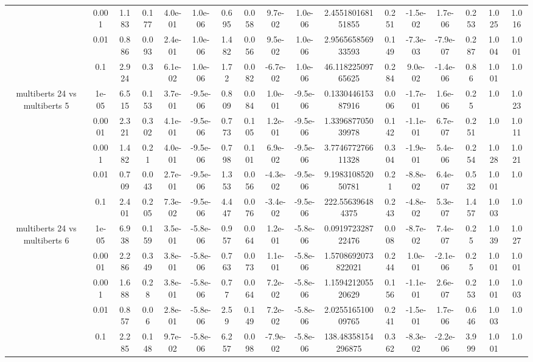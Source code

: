 \begin{tabular}{|c|c|c|c|c|c|c|c|c|c|c|c|c|c|c|c|c|}
 & 0.001 & 1.183 & 0.177 & 4.0e-01 & 1.0e-06 & 0.695 & 0.058 & 9.7e-02 & 1.0e-06 & 2.455180168151855 & 0.251 & -1.5e-02 & 1.7e-06 & 0.253 & 1.025 & 1.016 \\
 & 0.01 & 0.886 & 0.093 & 2.4e-01 & 1.0e-06 & 1.482 & 0.056 & 9.5e-02 & 1.0e-06 & 2.956565856933593 & 0.149 & -7.3e-03 & -7.9e-07 & 0.287 & 1.004 & 1.001 \\
 & 0.1 & 2.924 & 0.3 & 6.1e-02 & 1.0e-06 & 1.72 & 0.082 & -6.7e-02 & 1.0e-06 & 46.11822509765625 & 0.284 & 9.0e-02 & -1.4e-06 & 0.86 & 1.001 & 1.0 \\
\hline
\multirow{5}{*}{multiberts 24 vs multiberts 5} & 1e-05 & 6.515 & 0.153 & 3.7e-01 & -9.5e-06 & 0.809 & 0.084 & 1.0e-01 & -9.5e-06 & 0.133044615387916 & 0.006 & -1.7e-01 & 1.6e-06 & 0.25 & 1.0 & 1.023 \\
 & 0.0001 & 2.321 & 0.302 & 4.1e-01 & -9.5e-06 & 0.773 & 0.105 & 1.2e-01 & -9.5e-06 & 1.339687705039978 & 0.142 & -1.1e-01 & 6.7e-07 & 0.251 & 1.0 & 1.011 \\
 & 0.001 & 1.482 & 0.21 & 4.0e-01 & -9.5e-06 & 0.798 & 0.101 & 6.9e-02 & -9.5e-06 & 3.774677276611328 & 0.304 & -1.9e-01 & 5.4e-06 & 0.254 & 1.028 & 1.021 \\
 & 0.01 & 0.709 & 0.043 & 2.7e-01 & -9.5e-06 & 1.353 & 0.056 & -4.3e-02 & -9.5e-06 & 9.198310852050781 & 0.21 & -8.8e-02 & 6.4e-07 & 0.532 & 1.001 & 1.0 \\
 & 0.1 & 2.401 & 0.205 & 7.3e-02 & -9.5e-06 & 4.447 & 0.076 & -3.4e-02 & -9.5e-06 & 222.556396484375 & 0.243 & -4.8e-02 & 5.3e-07 & 1.457 & 1.003 & 1.0 \\
\hline
\multirow{5}{*}{multiberts 24 vs multiberts 6} & 1e-05 & 6.938 & 0.159 & 3.5e-01 & -5.8e-06 & 0.957 & 0.064 & 1.2e-01 & -5.8e-06 & 0.091972328722476 & 0.008 & -8.7e-02 & 7.4e-07 & 0.25 & 1.039 & 1.027 \\
 & 0.0001 & 2.286 & 0.349 & 3.8e-01 & -5.8e-06 & 0.763 & 0.073 & 1.1e-01 & -5.8e-06 & 1.5708692073822021 & 0.244 & 1.0e-01 & -2.1e-06 & 0.25 & 1.001 & 1.001 \\
 & 0.001 & 1.688 & 0.28 & 3.8e-01 & -5.8e-06 & 0.77 & 0.064 & 7.2e-02 & -5.8e-06 & 1.159421205520629 & 0.156 & -1.1e-01 & 2.6e-07 & 0.253 & 1.001 & 1.003 \\
 & 0.01 & 0.857 & 0.06 & 2.8e-01 & -5.8e-06 & 2.59 & 0.149 & 7.2e-02 & -5.8e-06 & 2.025516510009765 & 0.241 & -1.5e-01 & 1.7e-06 & 0.646 & 1.003 & 1.0 \\
 & 0.1 & 2.285 & 0.148 & 9.7e-02 & -5.8e-06 & 6.257 & 0.098 & -7.9e-02 & -5.8e-06 & 138.48358154296875 & 0.362 & -8.3e-02 & -2.2e-06 & 3.999 & 1.001 & 1.0 \\

\end{tabular}
